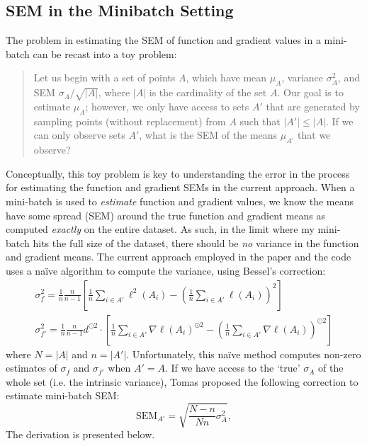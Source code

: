\documentclass{article}
\begin{document}
\subsection{SEM in the Minibatch Setting}
The problem in estimating the SEM of function and gradient values in a mini-batch can be recast into a toy problem:
\begin{quote}
Let us begin with a set of points $A$, which have mean $\mu_A$, variance $\sigma_A^2$, and SEM $\sigma_A/\sqrt{|A|}$, where $|A|$ is the cardinality of the set $A$. Our goal is to estimate $\mu_A$; however, we only have access to sets $A'$ that are generated by sampling points (without replacement) from $A$ such that $|A'| \leq |A|$. If we can only observe sets $A'$, what is the SEM of the means $\mu_{A'}$ that we observe?
\end{quote}
Conceptually, this toy problem is key to understanding the error in the process for estimating the function and gradient SEMs in the current approach. When a mini-batch is used to \emph{estimate} function and gradient values, we know the means have some spread (SEM) around the true function and gradient means as computed \emph{exactly} on the entire dataset. As such, in the limit where my mini-batch hits the full size of the dataset, there should be \emph{no} variance in the function and gradient means. The current approach employed in the paper and the code uses a naïve algorithm to compute the variance, using Bessel's correction:
\begin{gather}
\label{eq:sf} \sigma_f^2 = \frac{1}{n}\frac{n}{n-1} \left[\frac{1}{n} \sum_{i\in A'} \ell^2(A_i) - \left(\frac{1}{n} \sum_{i\in A'} \ell(A_i) \right)^2 \right] \\
\label{eq:sdf} \sigma_{f'}^2 = \frac{1}{n}\frac{n}{n-1} d^{\odot 2} \cdot \left[ \frac{1}{n} \sum_{i \in A'} \nabla \ell(A_i)^{\odot 2} - \left(\frac{1}{n} \sum_{i \in A'} \nabla \ell(A_i) \right)^{\odot 2} \right]
\end{gather}
where $N=|A|$ and $n=|A'|$. Unfortunately, this naïve method computes non-zero estimates of $\sigma_f$ and $\sigma_{f'}$ when $A' = A$. If we have access to the `true' $\sigma_A$ of the whole set (i.e. the intrinsic variance), Tomas proposed the following correction to estimate mini-batch SEM:
\begin{equation}
\label{eq:Tomas_correction}
\text{SEM}_{A'} = \sqrt{\frac{N-n}{Nn} \sigma_A^2},
\end{equation}
The derivation is presented below. 
\end{document}
